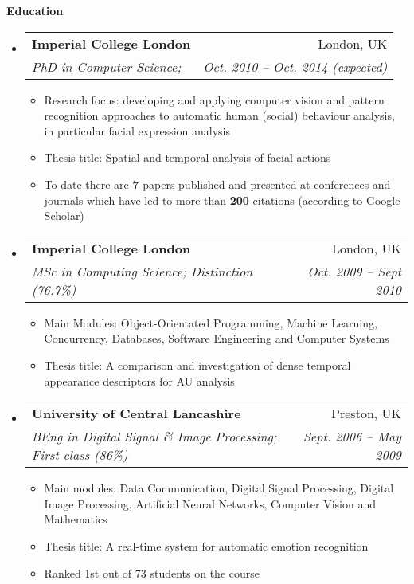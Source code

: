 \documentclass[letterpaper,11pt]{article}
\makeatletter
\newcommand{\resitem}[1]{\item #1 \vspace{-2pt}}
\newcommand{\resheading}[1]{{\large \colorbox{mygrey}{\begin{minipage}{\textwidth}{\textbf{#1 \vphantom{p\^{E}}}}\end{minipage}}}}
\newcommand{\ressubheading}[4]{
\begin{tabular*}{6.5in}{l@{\extracolsep{\fill}}r}
		\textbf{#1} & #2 \\
		\textit{#3} & \textit{#4} \\
\end{tabular*}\vspace{-6pt}}
\makeatother
\begin{document}
\resheading{Education}
	\begin{itemize}
		\item
			\ressubheading{{Imperial College London}}{London, UK}{{PhD in Computer Science}; }{Oct. 2010 -- Oct. 2014 (expected)}
				{ \small
				\begin{itemize}
					\resitem{Research focus: developing and applying computer vision and pattern recognition approaches to automatic human (social) behaviour analysis, in particular facial expression analysis }
					\resitem{Thesis title: Spatial and temporal analysis of facial actions }

					\resitem{To date there are \textbf{7} papers published and presented at conferences and journals which have led to more than \textbf{200} citations (according to Google Scholar) } 
				\end{itemize}
				}
		\item
			\ressubheading{{Imperial College London}}{London, UK}{{MSc in Computing Science}; Distinction (76.7\%) }{Oct. 2009 -- Sept 2010}
				{ \small
				\begin{itemize}
				\resitem{Main Modules: Object-Orientated Programming, Machine Learning, Concurrency, Databases, Software Engineering and Computer Systems}
				\resitem{Thesis title: A comparison and investigation of dense temporal appearance descriptors for AU analysis}
				\end{itemize}
				}
		\item
			\ressubheading{{University of Central Lancashire}}{Preston, UK}{{BEng in Digital Signal \& Image Processing}; First class (86\%) }{Sept. 2006 -- May 2009}
				{ \small
				\begin{itemize}
				\resitem{Main modules: Data Communication, Digital Signal Processing, Digital Image Processing, Artificial Neural Networks, Computer Vision and Mathematics}
				\resitem{Thesis title: A real-time system for automatic emotion recognition}
				\resitem{Ranked 1st out of 73 students on the course}
				\end{itemize}
				}
	\end{itemize} %
\end{document}
